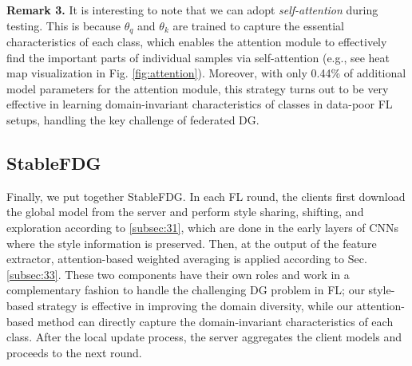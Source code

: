 \documentclass{article}
\theoremstyle{plain}
\theoremstyle{definition}
\theoremstyle{remark}
\begin{document}
 \textbf{Remark 3.}  It is interesting to note that  we can adopt \textit{self-attention} during testing. This is because         $\theta_q$ and $\theta_k$ are trained to capture the essential characteristics of each class, which enables the attention module to  effectively  find   the important parts  of  individual   samples   via self-attention (e.g.,  see heat map visualization in Fig.  \ref{fig:attention}).  Moreover, with only 0.44\% of additional  model  parameters for the attention module, this   strategy turns out to be very effective    in learning domain-invariant characteristics of classes   in data-poor FL setups, handling the key challenge of federated DG. %





 \vspace{-1mm}

\subsection{StableFDG}
\vspace{-1mm}
 Finally, we put together StableFDG. In  each  FL round, the clients first download the global model from the server  and perform style sharing, shifting, and exploration according to \ref{subsec:31}, which are done  in the early layers of CNNs where the style information is preserved. Then, at the output of the feature extractor, attention-based weighted averaging is applied  according to Sec. \ref{subsec:33}.  These two components have their own roles and work in a complementary fashion to handle the challenging DG problem in FL; our style-based strategy is effective in  improving the domain diversity, while our attention-based method can directly  capture the domain-invariant characteristics of each class.  After the local update process,   the server aggregates the client models and proceeds to the next round.  %
  
\end{document}
